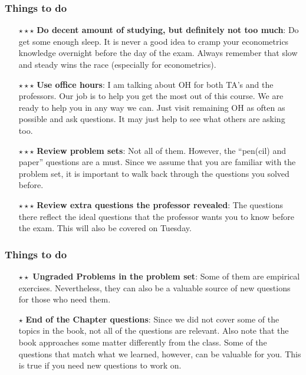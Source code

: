 \documentclass[aspectratio=169]{beamer}
\begin{document}
\begin{frame}
\frametitle{Things to do}
\begin{itemize} 
\item[$\star\star\star$] \textbf{Do decent amount of studying, but definitely not too much}: Do get some enough sleep. It is never a good idea to cramp your econometrics knowledge overnight before the day of the exam. Always remember that slow and steady wins the race (especially for econometrics). 
\item[$\star\star\star$] \textbf{Use office hours}: I am talking about OH for both TA's and the professors. Our job is to help you get the most out of this course. We  are ready to help you in any way we can. Just visit remaining OH as often as possible and ask questions. It may just help to see what others are asking too.
\item[$\star\star\star$]\textbf{Review problem sets}: Not all of them. However, the ``pen(cil) and paper'' questions are a must. Since we assume that you are familiar with the problem set, it is important to walk back through the questions you solved before. 
\item[$\star\star\star$]\textbf{Review extra questions the professor revealed}: The questions there reflect the ideal questions that the professor wants you to know before the exam. This will also be covered on Tuesday.
\end{itemize}
\end{frame}

\begin{frame}
\frametitle{Things to do}
\begin{itemize} 
\item[$\star\star$] \textbf{Ungraded Problems in the problem set}: Some of them are empirical exercises. Nevertheless, they can also be a valuable source of new questions for those who need them. 
\item[$\star$]\textbf{End of the Chapter questions}: Since we did not cover some of the topics in the book, not all of the questions are relevant. Also note that the book approaches some matter differently from the class. Some of the questions that match what we learned, however, can be valuable for you. This is true if you need new questions to work on. 
\end{itemize}
\end{frame}

\end{document}
